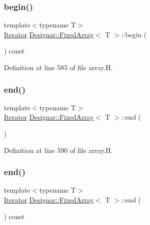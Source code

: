 \subsubsection{\texorpdfstring{begin()}{begin()}\hspace{0.1cm}{\footnotesize\ttfamily [2/2]}}
{\footnotesize\ttfamily template$<$typename T$>$ \\
\hyperlink{class_designar_1_1_fixed_array_1_1_iterator}{Iterator} \hyperlink{class_designar_1_1_fixed_array}{Designar\+::\+Fixed\+Array}$<$ T $>$\+::begin (\begin{DoxyParamCaption}{ }\end{DoxyParamCaption}) const\hspace{0.3cm}{\ttfamily [inline]}}



Definition at line 585 of file array.\+H.

\mbox{\label{class_designar_1_1_fixed_array_ab0baaf67153a51cb98ac12918d2387a0}} 
\subsubsection{\texorpdfstring{end()}{end()}\hspace{0.1cm}{\footnotesize\ttfamily [1/2]}}
{\footnotesize\ttfamily template$<$typename T$>$ \\
\hyperlink{class_designar_1_1_fixed_array_1_1_iterator}{Iterator} \hyperlink{class_designar_1_1_fixed_array}{Designar\+::\+Fixed\+Array}$<$ T $>$\+::end (\begin{DoxyParamCaption}{ }\end{DoxyParamCaption})\hspace{0.3cm}{\ttfamily [inline]}}



Definition at line 590 of file array.\+H.

\mbox{\label{class_designar_1_1_fixed_array_a02b4949630ddc32ba5971fd4b78cf8ab}} 
\subsubsection{\texorpdfstring{end()}{end()}\hspace{0.1cm}{\footnotesize\ttfamily [2/2]}}
{\footnotesize\ttfamily template$<$typename T$>$ \\
\hyperlink{class_designar_1_1_fixed_array_1_1_iterator}{Iterator} \hyperlink{class_designar_1_1_fixed_array}{Designar\+::\+Fixed\+Array}$<$ T $>$\+::end (\begin{DoxyParamCaption}{ }\end{DoxyParamCaption}) const\hspace{0.3cm}{\ttfamily [inline]}}




